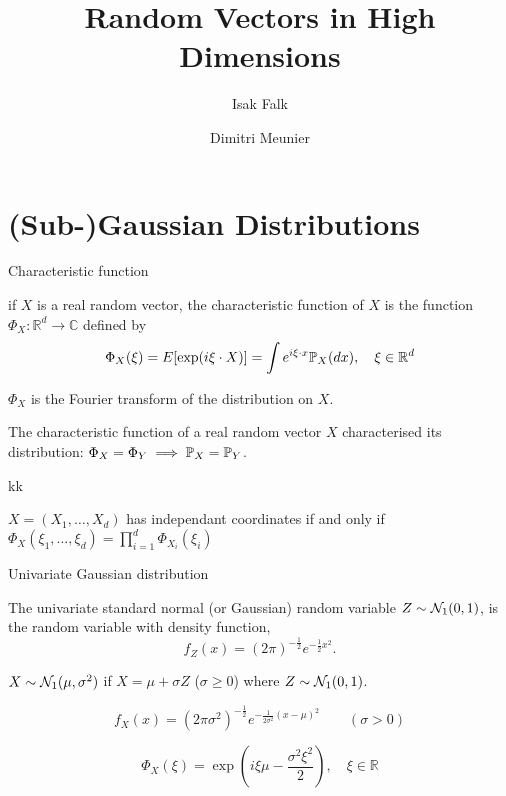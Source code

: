 \documentclass{beamer}
\title{Random Vectors in High Dimensions}
\author{Isak Falk \and Dimitri Meunier}
\institute{IITT}
\begin{document}
  \maketitle

\section{(Sub-)Gaussian Distributions}

  \begin{frame}{Characteristic function}

    \begin{definition}
      if $X$ is a real random vector, the characteristic function of $X$ is the function
      $\Phi_{X}: \mathbb{R}^{d} \longrightarrow \mathbb{C}$ defined by 
      $$
      \Phi_{X}(\xi)=E[\exp (i \xi \cdot X)] = \int e^{i \xi \cdot x} \P_{X}(d x), \quad \xi \in \mathbb{R}^{d}
      $$

      $\Phi_{X}$ is the Fourier transform of the distribution on $X$.
    \end{definition}

    \pause

    \begin{theorem}
      The characteristic function of a real random vector $X$ characterised its
      distribution: $\Phi_X = \Phi_Y \implies \P_X = \P_Y$.
    \end{theorem}kk

    \pause

    \begin{prop}
      $X=(X_1,\ldots,X_d)$ has independant coordinates if and only if \\ 
      $\Phi_{X}\left(\xi_{1}, \ldots, \xi_{d}\right)=\prod_{i=1}^{d}
      \Phi_{X_{i}}\left(\xi_{i}\right)$
    \end{prop}
  \end{frame}

  \begin{frame}{Univariate Gaussian distribution}
    
    The univariate standard normal (or Gaussian) random variable  $Z \sim
    \cN_1(0,1)$, is the random variable with density function,
    $$f_Z(x)=(2\pi)^{-\frac{1}{2}} e^{-\frac{1}{2}x^{2}}.$$

    \pause

    $X \sim \cN_1(\mu,\sigma^2)$ if $X = \mu + \sigma Z$
    ($\sigma \geq 0$) where  $Z \sim \cN_1(0,1)$.

    $$f_X(x)=(2
    \pi\sigma^2)^{-\frac{1}{2}} e^{-\frac{1}{2\sigma^2}(x-\mu)^{2}} \qquad
    (\sigma > 0) $$

    \pause
    
      $$
      \Phi_{X}(\xi)=\exp \left(i\xi \mu -\frac{\sigma^{2} \xi^{2}}{2}\right), \quad \xi \in \mathbb{R}
      $$
  \end{frame}
\end{document}
